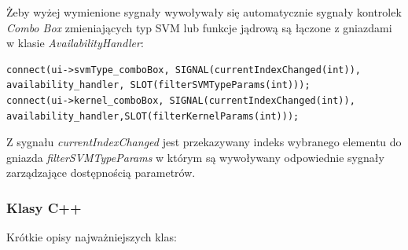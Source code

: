\documentclass[paper=a4, fontsize=11pt]{scrartcl} %
\numberwithin{equation}{section} %
\numberwithin{figure}{section} %
\begin{document}
    \par Żeby wyżej wymienione sygnały wywoływały się automatycznie sygnały kontrolek
    \textit{Combo Box} zmieniających typ SVM lub funkcje jądrową są łączone z gniazdami w
    klasie \textit{AvailabilityHandler}:

    \begin{lstlisting}
connect(ui->svmType_comboBox, SIGNAL(currentIndexChanged(int)), availability_handler, SLOT(filterSVMTypeParams(int)));
connect(ui->kernel_comboBox, SIGNAL(currentIndexChanged(int)), availability_handler,SLOT(filterKernelParams(int)));
    \end{lstlisting}

    \par Z sygnału \textit{currentIndexChanged} jest przekazywany indeks wybranego elementu do
    gniazda \textit{filterSVMTypeParams} w którym są wywoływany odpowiednie sygnały
    zarządzające dostępnością parametrów.

    \newpage
    \subsubsection{Klasy C++}
    Krótkie opisy najważniejszych klas:\\
\end{document}
